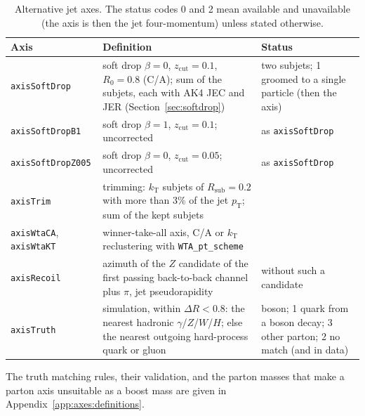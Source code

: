 \documentclass[11pt]{article}
\newcommand{\pt}{p_{\mathrm{T}}}
\newcommand{\code}[1]{\texttt{#1}}
\begin{document}
\begin{table}[htbp]
\centering
\caption{Alternative jet axes. The status codes 0 and 2 mean available and unavailable (the axis is then the jet
four-momentum) unless stated otherwise.}
\label{tab:axes}
\small
\begin{tabularx}{\textwidth}{>{\raggedright\arraybackslash}p{2.9cm}>{\raggedright\arraybackslash}X>{\raggedright\arraybackslash}p{4.0cm}}
\toprule
Axis & Definition & Status \\
\midrule
\code{axisSoftDrop} & soft drop $\beta = 0$, $z_\mathrm{cut} = 0.1$, $R_0 = 0.8$ (C/A); sum of the subjets, each
  with AK4 JEC and JER (Section~\ref{sec:softdrop}) & 0 two subjets; 1 groomed to a single particle (then the axis) \\
\code{axisSoftDropB1} & soft drop $\beta = 1$, $z_\mathrm{cut} = 0.1$; uncorrected & as \code{axisSoftDrop} \\
\code{axisSoftDropZ005} & soft drop $\beta = 0$, $z_\mathrm{cut} = 0.05$; uncorrected & as \code{axisSoftDrop} \\
\code{axisTrim} & trimming: $k_\mathrm{T}$ subjets of $R_\mathrm{sub} = 0.2$ with more than 3\% of the jet $\pt$;
  sum of the kept subjets & \\
\code{axisWtaCA}, \code{axisWtaKT} & winner-take-all axis, C/A or $k_\mathrm{T}$ reclustering with
  \code{WTA\_pt\_scheme} & \\
\code{axisRecoil} & azimuth of the $Z$ candidate of the first passing back-to-back channel plus $\pi$, jet
  pseudorapidity & 2 without such a candidate \\
\code{axisTruth} & simulation, within $\Delta R < 0.8$: the nearest hadronic $\gamma$/$Z$/$W$/$H$; else the nearest
  outgoing hard-process quark or gluon & 0 boson; 1 quark from a boson decay; 3 other parton; 2 no match (and in
  data) \\
\bottomrule
\end{tabularx}
\end{table}
The truth matching rules, their validation, and the parton masses that make a parton axis unsuitable as a boost mass
are given in Appendix~\ref{app:axes:definitions}.
\end{document}

